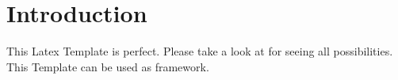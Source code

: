 \chapter{Introduction}
\label{chap:introduction}
This Latex Template is perfect. Please take a look at  for seeing all possibilities. This Template can be used as \gls{framework}.